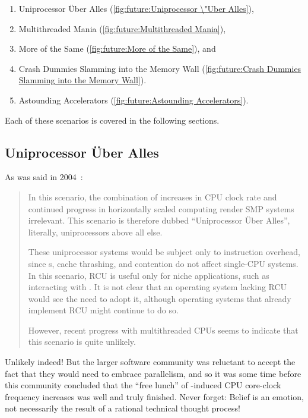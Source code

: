 \begin{enumerate}
\item	Uniprocessor \"Uber Alles
	(\cref{fig:future:Uniprocessor \"Uber Alles}),
\item	Multithreaded Mania
	(\cref{fig:future:Multithreaded Mania}),
\item	More of the Same
	(\cref{fig:future:More of the Same}), and
\item	Crash Dummies Slamming into the Memory Wall
	(\cref{fig:future:Crash Dummies Slamming into the Memory Wall}).
\item	Astounding Accelerators
	(\cref{fig:future:Astounding Accelerators}).
\end{enumerate}

Each of these scenarios is covered in the following sections.

\subsection{Uniprocessor \"Uber Alles}
\label{sec:future:Uniprocessor \"Uber Alles}

As was said in 2004~\cite{PaulEdwardMcKenneyPhD}:

\begin{quote}
	In this scenario, the combination of 
	increases in CPU
	clock rate and continued progress in horizontally scaled computing
	render SMP systems irrelevant.
	This scenario is therefore dubbed ``Uniprocessor \"Uber
	Alles'', literally, uniprocessors above all else.

	These uniprocessor systems would be subject only to instruction
	overhead, since s, cache thrashing, and contention
	do not affect single-CPU systems.
	In this scenario, RCU is useful only for niche applications, such
	as interacting with .
	It is not clear that an operating system lacking RCU would see
	the need to adopt it, although operating
	systems that already implement RCU might continue to do so.

	However, recent progress with multithreaded CPUs seems to indicate
	that this scenario is quite unlikely.
\end{quote}

Unlikely indeed!
But the larger software community was reluctant to accept the fact that
they would need to embrace parallelism, and so it was some time before
this community concluded that the ``free lunch'' of
-induced
CPU core-clock frequency increases was well and truly finished.
Never forget:
Belief is an emotion, not necessarily the result of a rational technical
thought process!


